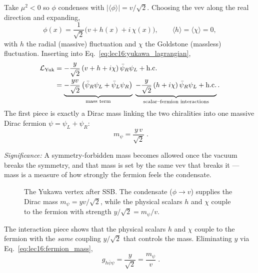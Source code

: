 Take $\mu^2<0$ so $\phi$ condenses with $|\langle\phi\rangle|=v/\sqrt2$. Choosing the vev along the real direction and expanding,
\begin{equation}
  \phi(x)=\frac{1}{\sqrt2}\big(v+h(x)+i\,\chi(x)\big),
  \qquad
  \langle h\rangle=\langle\chi\rangle=0 ,
  \label{eq:lec16:yukawa_field_expansion}
\end{equation}
with $h$ the radial (massive) fluctuation and $\chi$ the Goldstone (massless) fluctuation. Inserting into Eq.~\eqref{eq:lec16:yukawa_lagrangian},
\begin{align}
  \mathcal{L}_{\text{Yuk}}
  &=-\frac{y}{\sqrt2}\,(v+h+i\chi)\,\bar\psi_R\psi_L+\text{h.c.}
    \notag\\
  &=\underbrace{-\frac{yv}{\sqrt2}\,\big(\bar\psi_R\psi_L+\bar\psi_L\psi_R\big)}_{\text{mass term}}
    \;\underbrace{-\frac{y}{\sqrt2}\,(h+i\chi)\,\bar\psi_R\psi_L+\text{h.c.}}_{\text{scalar--fermion interactions}} .
  \label{eq:lec16:yukawa_expanded}
\end{align}
The first piece is exactly a Dirac mass linking the two chiralities into one massive Dirac fermion $\psi=\psi_L+\psi_R$:
\begin{equation}
  \boxed{\;m_\psi=\frac{y\,v}{\sqrt2}\; .}
  \label{eq:lec16:fermion_mass}
\end{equation}

\textit{Significance:} A symmetry-forbidden mass becomes allowed once the vacuum breaks the symmetry, and that mass is set by the same vev that breaks it --- mass is a measure of how strongly the fermion feels the condensate.

\begin{figure}[ht]
\centering
{}
\caption{The Yukawa vertex after SSB. The condensate ($\phi\to v$) supplies the Dirac mass $m_\psi=yv/\sqrt2$, while the physical scalars $h$ and $\chi$ couple to the fermion with strength $y/\sqrt2=m_\psi/v$.}
\label{fig:lec16:yukawa-vertex}
\end{figure}

The interaction piece shows that the physical scalars $h$ and $\chi$ couple to the fermion with the \emph{same} coupling $y/\sqrt2$ that controls the mass. Eliminating $y$ via Eq.~\eqref{eq:lec16:fermion_mass},
\begin{equation}
  \boxed{\;g_{h\bar\psi\psi}=\frac{y}{\sqrt2}=\frac{m_\psi}{v}\; .}
  \label{eq:lec16:scalar_coupling_mass}
\end{equation}

